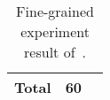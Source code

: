 {\begin{table}[t]
{\begin{tabular}{crcrcr}
Total                                          & 60                                    & \multicolumn{4}{c}{}                                                                                                                                                                             \\ \bottomrule
\end{tabular}
}
\caption{Fine-grained experiment result of~\spartacus.}
\label{tab:finegrain}
\end{table}
}